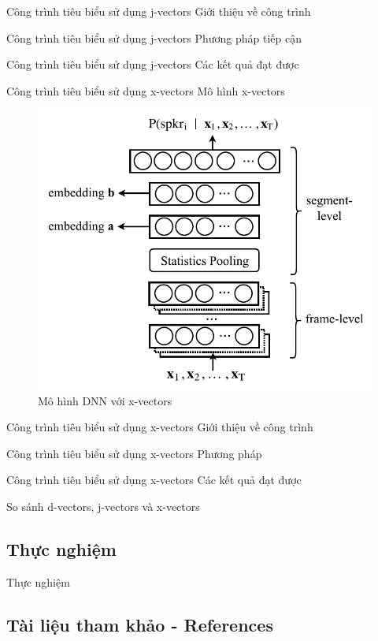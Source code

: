 \documentclass[notheorems, aspectratio=54]{beamer}
\begin{document}
\begin{frame}{Công trình tiêu biểu sử dụng j-vectors}
	Giới thiệu về công trình
\end{frame}
\begin{frame}{Công trình tiêu biểu sử dụng j-vectors}
	Phương pháp tiếp cận
\end{frame}
\begin{frame}{Công trình tiêu biểu sử dụng j-vectors}
	Các kết quả đạt được
\end{frame}
\begin{frame}{Công trình tiêu biểu sử dụng x-vectors}
	Mô hình x-vectors
	\begin{figure}[H]
		\includegraphics[width=0.65\linewidth]{images/x-vector.jpg}
		\caption{Mô hình DNN với x-vectors}
		\label{fig:writing-thesis}
	\end{figure}
\end{frame}
\begin{frame}{Công trình tiêu biểu sử dụng x-vectors}
	Giới thiệu về công trình
\end{frame}
\begin{frame}{Công trình tiêu biểu sử dụng x-vectors}
	Phương pháp
\end{frame}
\begin{frame}{Công trình tiêu biểu sử dụng x-vectors}
	Các kết quả đạt được
\end{frame}
\begin{frame}{So sánh d-vectors, j-vectors và x-vectors}
	
\end{frame}
\subsection{Thực nghiệm}
\begin{frame}{Thực nghiệm}
\end{frame}
\subsection{Tài liệu tham khảo - References}
\begin{frame}
	\nocite{*}
	\newpage\cleardoublepage
	
\end{frame}
\end{document}
